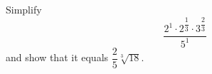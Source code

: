 Simplify
\[
\dfrac{2^1\cdot2^{\dfrac{1}{3}}\cdot3^{\dfrac{2}{3}}}{5^1}
\]
and show that it equals $\dfrac{2}{5}\sqrt[3]{18}$.
